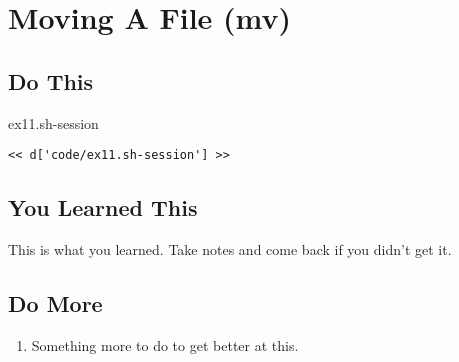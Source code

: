 \chapter{Moving A File (mv)}

\section{Do This}

\begin{code}{ex11.sh-session}
\begin{Verbatim}
<< d['code/ex11.sh-session'] >>
\end{Verbatim}
\end{code}


\section{You Learned This}

This is what you learned.  Take notes and come back if you didn't get it.

\section{Do More}

\begin{enumerate}
\item Something more to do to get better at this.
\end{enumerate}

